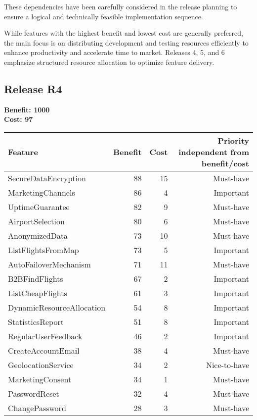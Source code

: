 These dependencies have been carefully considered in the release planning to ensure a logical and technically feasible implementation sequence.

While features with the highest benefit and lowest cost are generally preferred, the main focus is on distributing development and testing resources efficiently to enhance productivity and accelerate time to market. Releases 4, 5, and 6 emphasize structured resource allocation to optimize feature delivery.

\subsection{Release R4}
\textbf{Benefit: 1000} \\
\textbf{Cost: 97} \\

\begin{tabular}{lrrr}
\toprule
\textbf{Feature} & \textbf{Benefit} & \textbf{Cost} & \textbf{Priority} independent from benefit/cost \\
\midrule
SecureDataEncryption & 88 & 15 & Must-have \\
MarketingChannels & 86 & 4 & Important \\
UptimeGuarantee & 82 & 9 & Must-have \\
AirportSelection & 80 & 6 & Must-have \\
AnonymizedData & 73 & 10 & Must-have \\
ListFlightsFromMap & 73 & 5 & Important \\
AutoFailoverMechanism & 71 & 11 & Must-have \\
B2BFindFlights & 67 & 2 & Important \\
ListCheapFlights & 61 & 3 & Important \\
DynamicResourceAllocation & 54 & 8 & Important \\
StatisticsReport & 51 & 8 & Important \\
RegularUserFeedback & 46 & 2 & Important \\
CreateAccountEmail & 38 & 4 & Must-have \\
GeolocationService & 34 & 2 & Nice-to-have \\
MarketingConsent & 34 & 1 & Must-have \\
PasswordReset & 32 & 4 & Must-have \\
ChangePassword & 28 & 3 & Must-have \\
\bottomrule 
\end{tabular}

